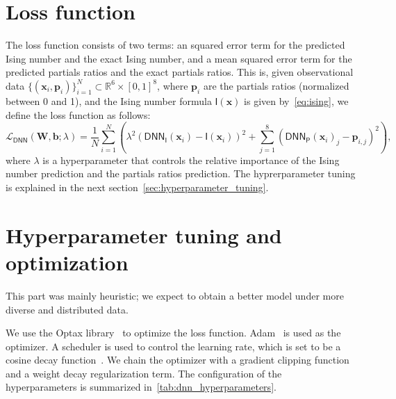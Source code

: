 \documentclass{psu-report}
\begin{document}
\section{Loss function}

The loss function consists of two terms: an squared error term for the
predicted Ising number and the exact Ising number, and a mean squared error term
for the predicted partials ratios and the exact partials ratios.
This is, given observational data \(\{ (\mathbf{x}_i, \mathbf{p}_i)\}_{i=1}^N
\subset \mathbb{R}^6 \times [0,1]^8\), where \(\mathbf{p}_i\) are the
partials ratios (normalized between 0 and 1), and the Ising number formula
\(\mathsf{I}(\mathbf{x})\) is given by~\eqref{eq:ising}, we define the loss
function as follows:
\begin{equation}
    \label{eq:dnn_loss}
    \mathscr{L}_\mathsf{DNN}(\mathbf{W}, \mathbf{b}; \lambda) =
    \frac{1}{N} \sum_{i=1}^N \left(
        \lambda^2 \left( \mathsf{DNN}_\mathsf{I}(\mathbf{x}_i) - \mathsf{I}(\mathbf{x}_i) \right)^2
        +
        \sum_{j=1}^8 \left( \mathsf{DNN}_\mathsf{P}(\mathbf{x}_i)_j - \mathbf{p}_{i,j} \right)^2
    \right),
\end{equation}
where \(\lambda\) is a hyperparameter that controls the relative importance of
the Ising number prediction and the partials ratios prediction.
The hyprerparameter tuning is explained in the next section~\autoref{sec:hyperparameter_tuning}.

\section{Hyperparameter tuning and optimization}
\label{sec:hyperparameter_tuning}

This part was mainly heuristic; we expect to obtain a better model under
more diverse and distributed data.

We use the Optax library~\autocite{2020Optax-1} to optimize the loss function.
Adam~\autocite{2014Kin-1} is used as the optimizer.
A scheduler is used to control the learning rate, which is set to
be a cosine decay function~\autocite{2016LosHut-1}.
We chain the optimizer with a gradient clipping function and a weight decay
regularization term.
The configuration of the hyperparameters is summarized
in~\autoref{tab:dnn_hyperparameters}.
\end{document}
